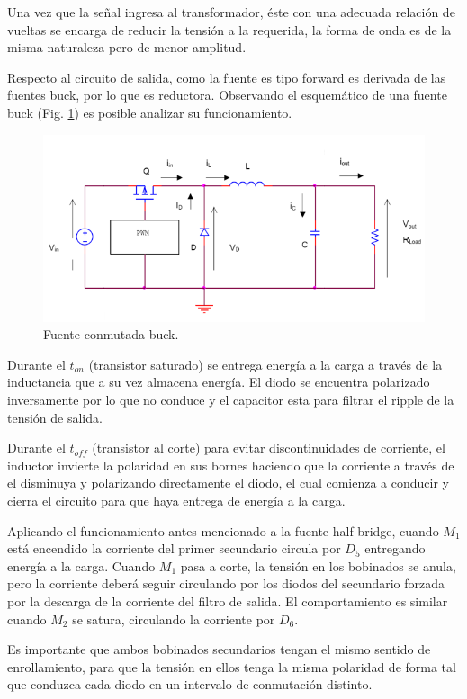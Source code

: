 \documentclass[11pt, a4paper]{article}
\begin{document}
Una vez que la señal ingresa al transformador, éste con una adecuada relación de vueltas se encarga de reducir la tensión a la requerida, la forma de onda es de la misma naturaleza pero de menor amplitud.

Respecto al circuito de salida, como la fuente es tipo forward es derivada de las fuentes buck, por lo que es reductora. Observando el esquemático de una fuente buck (Fig. \ref{buck}) es posible analizar su funcionamiento.
\begin{figure}[h]
	\centering
	\includegraphics[width = 10 cm]{Imagenes/buck}
	\caption{Fuente conmutada buck.}
	\label{buck}
\end{figure}

Durante el $t_{on}$ (transistor saturado) se entrega energía a la carga a través de la inductancia que a su vez almacena energía. El diodo se encuentra polarizado inversamente por lo que no conduce y el capacitor esta para filtrar el ripple de la tensión de salida.

Durante el $t_{off}$ (transistor al corte) para evitar discontinuidades de corriente, el inductor invierte la polaridad en sus bornes haciendo que la corriente a través de el disminuya y polarizando directamente el diodo, el cual comienza a conducir y cierra el circuito para que haya entrega de energía a la carga.

Aplicando el funcionamiento antes mencionado a la fuente half-bridge, cuando $M_1$ está encendido la corriente del primer secundario circula por $D_5$ entregando energía a la carga. Cuando $M_1$ pasa a corte, la tensión en los bobinados se anula, pero la corriente deberá seguir circulando por los diodos del secundario forzada por la descarga de la corriente del filtro de salida. El comportamiento es similar cuando $M_2$ se satura, circulando la corriente por $D_6$.

Es importante que ambos bobinados secundarios tengan el mismo sentido de enrollamiento, para que la tensión en ellos tenga la misma polaridad de forma tal que conduzca cada diodo en un intervalo de conmutación distinto.
\end{document}
